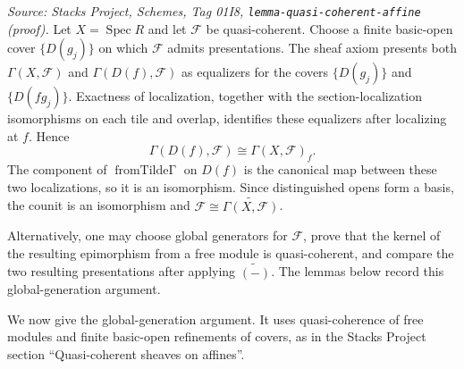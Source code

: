 \begin{remark}
  \label{mk-rem:o1i8_decomposition}
  \textit{Source: Stacks Project, Schemes, Tag 01I8, \texttt{lemma-quasi-coherent-affine}
  (proof).}
  Let \(X=\operatorname{Spec}R\) and let \(\mathcal F\) be quasi-coherent. Choose a
  finite basic-open cover \(\{D(g_j)\}\) on which \(\mathcal F\) admits presentations.
  The sheaf axiom presents both \(\Gamma(X,\mathcal F)\) and
  \(\Gamma(D(f),\mathcal F)\) as equalizers for the covers \(\{D(g_j)\}\) and
  \(\{D(fg_j)\}\). Exactness of localization, together with the section-localization
  isomorphisms on each tile and overlap, identifies these equalizers after localizing
  at \(f\). Hence
  \[
    \Gamma(D(f),\mathcal F)\cong\Gamma(X,\mathcal F)_f.
  \]
  The component of \(\operatorname{fromTilde\Gamma}\) on \(D(f)\) is the canonical map
  between these two localizations, so it is an isomorphism. Since distinguished opens
  form a basis, the counit is an isomorphism and
  \(\mathcal F\cong\widetilde{\Gamma(X,\mathcal F)}\).

  Alternatively, one may choose global generators for \(\mathcal F\), prove that the
  kernel of the resulting epimorphism from a free module is quasi-coherent, and compare
  the two resulting presentations after applying \(\widetilde{(-)}\). The lemmas below
  record this global-generation argument.
\end{remark}

We now give the global-generation argument. It uses quasi-coherence of free modules
and finite basic-open refinements of covers, as in the Stacks Project section
``Quasi-coherent sheaves on affines''.

